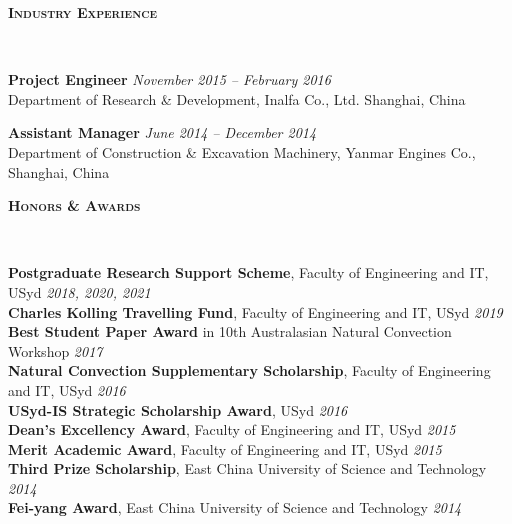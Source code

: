 \documentclass[letterpaper, 10pt]{article}
\newenvironment{changemargin}[2]{%
  \begin{list}{}{%
      \setlength{\topsep}{0pt}%
      \setlength{\leftmargin}{#1}%
      \setlength{\rightmargin}{#2}%
      \setlength{\listparindent}{\parindent}%
      \setlength{\itemindent}{\parindent}%
      \setlength{\parsep}{\parskip}%
    }%
  \item[]}{\end{list}
}
\newcommand{\lineover}{
  \begin{changemargin}{-0.05in}{-0.05in}
    \vspace*{-8pt}
    \hrulefill \\
    \vspace*{-2pt}
  \end{changemargin}
}
\newcommand{\header}[1]{
  \begin{changemargin}{-0.5in}{-0.5in}
    \textbf{\scshape{#1}}\\
    \lineover
  \end{changemargin}
}
\newenvironment{body} {
  \vspace*{-16pt}
  \begin{changemargin}{-0.25in}{-0.5in}
  }
  {\end{changemargin}
}
\begin{document}
\header{Industry Experience}
\begin{body}
	\vspace{14pt}
	
	\textbf{Project Engineer}\hfill
	\emph{November 2015 -- February 2016} \\
	Department of Research \& Development, Inalfa Co., Ltd.  \hfill Shanghai, China
	\vspace{-2pt}
	\smallskip
	
	
	\textbf{Assistant Manager}\hfill
	\emph{June 2014 -- December 2014} \\
	Department of Construction \& Excavation Machinery, Yanmar Engines Co.,  \hfill Shanghai, China
	\vspace{-2pt}
	

\end{body}
\smallskip
\header{Honors \& Awards}
\begin{body}
	\vspace{14pt}
	\textbf{Postgraduate Research Support Scheme}, Faculty of Engineering and IT, USyd\hfill
	\emph{2018, 2020, 2021}\\ \smallskip
	\textbf{Charles Kolling Travelling Fund}, Faculty of Engineering and IT, USyd\hfill
	\emph{2019}\\ \smallskip
	\textbf{Best Student Paper Award}
	in 10th Australasian Natural Convection Workshop
	\hfill \emph{2017}\\ \smallskip
	\textbf{Natural Convection Supplementary Scholarship}, Faculty of Engineering and IT, USyd \hfill
	\emph{2016}\\ \smallskip
	\textbf{USyd-IS Strategic Scholarship Award}, 
	USyd \hfill \emph{2016}\\
	\smallskip
	\textbf{Dean's Excellency Award}, Faculty of Engineering and IT, USyd \hfill \emph{2015}\\
	\textbf{Merit Academic Award}, Faculty of Engineering and IT, USyd \hfill \emph{2015}\\
	\textbf{Third Prize Scholarship}, East China University of Science and Technology \hfill \emph{2014}\\
	\textbf{Fei-yang Award}, East China University of Science and Technology \hfill \emph{2014}\\
	
	
\end{body}
\end{document}
